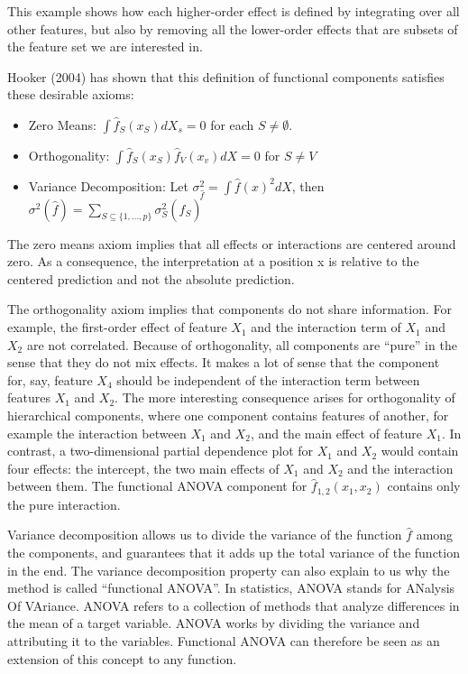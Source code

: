 \documentclass[
  11pt,
]{scrbook}
\providecommand{\tightlist}{%
  \setlength{\itemsep}{0pt}\setlength{\parskip}{0pt}}
\begin{document}
This example shows how each higher-order effect is defined by integrating over all other features, but also by removing all the lower-order effects that are subsets of the feature set we are interested in.

Hooker (2004) has shown that this definition of functional components satisfies these desirable axioms:

\begin{itemize}
\tightlist
\item
  Zero Means: \(\int{}\hat{f}_S(x_S)dX_s=0\) for each \(S\neq\emptyset\).
\item
  Orthogonality: \(\int{}\hat{f}_S(x_S)\hat{f}_V(x_v)dX=0\) for \(S\neq{}V\)
\item
  Variance Decomposition: Let \(\sigma^2_{\hat{f}}=\int \hat{f}(x)^2dX\), then \(\sigma^2(\hat{f}) = \sum_{S \subseteq \{1,\ldots,p\}} \sigma^2_S(\hat{f}_S)\)
\end{itemize}

The zero means axiom implies that all effects or interactions are centered around zero.
As a consequence, the interpretation at a position x is relative to the centered prediction and not the absolute prediction.

The orthogonality axiom implies that components do not share information.
For example, the first-order effect of feature \(X_1\) and the interaction term of \(X_{1}\) and \(X_2\) are not correlated.
Because of orthogonality, all components are ``pure'' in the sense that they do not mix effects.
It makes a lot of sense that the component for, say, feature \(X_4\) should be independent of the interaction term between features \(X_1\) and \(X_2\).
The more interesting consequence arises for orthogonality of hierarchical components, where one component contains features of another, for example the interaction between \(X_1\) and \(X_2\), and the main effect of feature \(X_1\).
In contrast, a two-dimensional partial dependence plot for \(X_1\) and \(X_2\) would contain four effects: the intercept, the two main effects of \(X_1\) and \(X_2\) and the interaction between them.
The functional ANOVA component for \(\hat{f}_{1,2}(x_1,x_2)\) contains only the pure interaction.

Variance decomposition allows us to divide the variance of the function \(\hat{f}\) among the components, and guarantees that it adds up the total variance of the function in the end.
The variance decomposition property can also explain to us why the method is called ``functional ANOVA''.
In statistics, ANOVA stands for ANalysis Of VAriance.
ANOVA refers to a collection of methods that analyze differences in the mean of a target variable.
ANOVA works by dividing the variance and attributing it to the variables.
Functional ANOVA can therefore be seen as an extension of this concept to any function.
\end{document}
